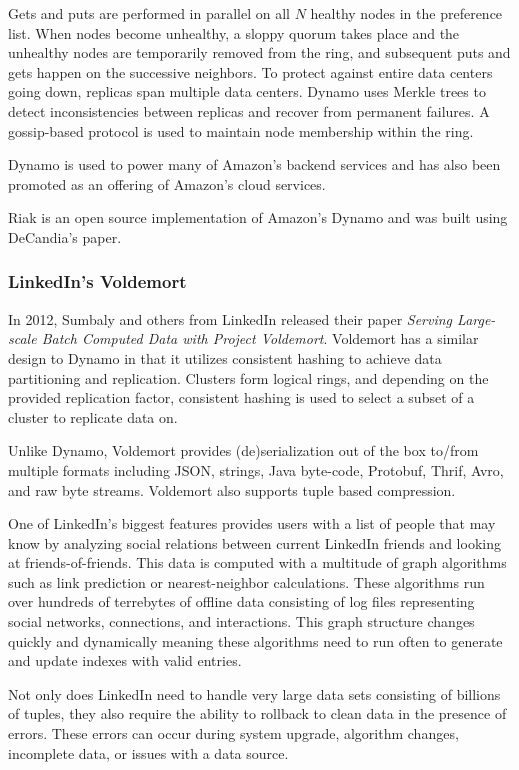 \documentclass[]{article}
\begin{document}
Gets and puts are performed in parallel on all $N$ healthy nodes in the preference list. When nodes become unhealthy, a sloppy quorum takes place and the unhealthy nodes are temporarily removed from the ring, and subsequent puts and gets happen on the successive neighbors. To protect against entire data centers going down, replicas span multiple data centers. Dynamo uses Merkle trees to detect inconsistencies between replicas and recover from permanent failures. A gossip-based protocol is used to maintain node membership within the ring.

Dynamo is used to power many of Amazon's backend services and has also been promoted as an offering of Amazon's cloud services.

Riak\cite{Klophaus:2010:RCB:1900160.1900176} is an open source implementation of Amazon's Dynamo and was built using DeCandia's paper.

\subsubsection{LinkedIn's Voldemort}\label{sssec:linkedins-voldemort}
In 2012, Sumbaly and others from LinkedIn released their paper \textit{Serving Large-scale Batch Computed Data with Project Voldemort}\cite{Sumbaly:2012:SLB:2208461.2208479}. Voldemort has a similar design to Dynamo in that it utilizes consistent hashing to achieve data partitioning and replication. Clusters form logical rings, and depending on the provided replication factor, consistent hashing is used to select a subset of a cluster to replicate data on.

Unlike Dynamo, Voldemort provides (de)serialization out of the box to/from multiple formats including JSON, strings, Java byte-code, Protobuf, Thrif, Avro, and raw byte streams. Voldemort also supports tuple based compression.

One of LinkedIn's biggest features provides users with a list of people that may know by analyzing social relations between current LinkedIn friends and looking at friends-of-friends. This data is computed with a multitude of graph algorithms such as link prediction or nearest-neighbor calculations. These algorithms run over hundreds of terrebytes of offline data consisting of log files representing social networks, connections, and interactions. This graph structure changes quickly and dynamically meaning these algorithms need to run often to generate and update indexes with valid entries. 

Not only does LinkedIn need to handle very large data sets consisting of billions of tuples, they also require the ability to rollback to clean data in the presence of errors. These errors can occur during system upgrade, algorithm changes, incomplete data, or issues with a data source.
\end{document}
